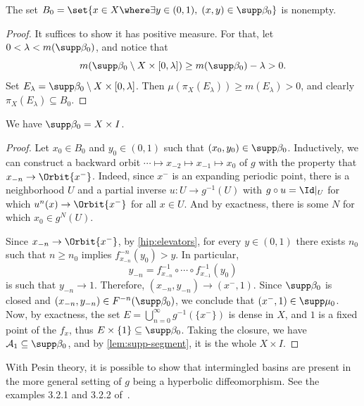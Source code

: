 \documentclass[../main]{subfiles}
\begin{document}
\begin{lemma}\label{lem:basin-pos-full}
  The set \(B_0 = \set{x \in X \where \exists y \in (0,1), \; (x,y) \in \supp \beta_0}\) is nonempty.
\end{lemma}

\begin{proof}
  It suffices to show it has positive measure. For that, let \(0 < \lambda < m(\supp \beta_0)\), and notice that \[m(\supp \beta_0 \setminus X \times [0,\lambda]) \ge m(\supp \beta_0) - \lambda > 0.\]
  Set \(E_{\lambda} = \supp \beta_0 \setminus X \times [0,\lambda]\). Then \(\mu(\pi_X(E_{\lambda})) \ge m(E_{\lambda}) > 0\), and clearly \(\pi_X(E_{\lambda}) \subseteq B_0\).

\end{proof}


\begin{corollary}\label{cor:basins-eq}
  We have \(\supp \beta_0 = X \times I\).
\end{corollary}

\begin{proof}
  Let \(x_0 \in B_0\) and \(y_0 \in (0,1)\) such that \((x_0,y_0) \in \supp \beta_0\).
  Inductively, we can construct a backward orbit \(\cdots \mapsto x_{-2} \mapsto x_{-1} \mapsto x_0\) of \(g\) with the property that \(x_{-n} \to \Orbit{x^-}\). Indeed, since \(x^-\) is an expanding periodic point, there is a neighborhood \(U\) and a partial inverse \(u \colon U \to g^{-1}(U)\) with \(g \circ u = \Id|_U\) for which \(u^n(x) \to \Orbit{x^-}\) for all \(x \in U\). And by exactness, there is some \(N\) for which \(x_0 \in g^N(U)\).


  Since \(x_{-n} \to \Orbit{x^-}\), by \cref{hip:elevators}, for every \(y \in (0,1)\) there exists \(n_0\) such that \(n \geq n_0\) implies \(f_{x_{-n}}^{-n}(y_0) > y\). In particular,
  \[y_{ - n} = f_{x_{-n}}^{-1} \circ \cdots \circ f_{x_{-1}}^{-1}(y_0)\]
  is such that \(y_{ - n} \to 1\). Therefore, \((x_{-n},y_{-n}) \to (x^-,1)\). Since \(\supp \beta_0\) is closed and \((x_{ - n},y_{ - n}) \in F^{-n}(\supp \beta_0)\), we conclude that \((x^-, 1) \in \supp \mu_0\). Now, by exactness, the set \(E = \bigcup_{n = 0}^{\infty}g ^{-1}(\{ x^- \})\) is dense in \(X\), and \(1\) is a fixed point of the \(f_x\), thus \(E \times \{ 1 \} \subseteq \supp \beta_0\). Taking the closure, we have \(\mathcal{A}_1 \subseteq \supp \beta_0\), and by \cref{lem:supp-segment}, it is the whole \(X \times I\).
\end{proof}

\begin{remark}
  With Pesin theory, it is possible to show that intermingled basins are present in the more general setting of \(g\) being a hyperbolic diffeomorphism. See the examples 3.2.1 and 3.2.2 of~\cite{uresNonrobustnessIntermingledBasins2018}.
\end{remark}
\end{document}
